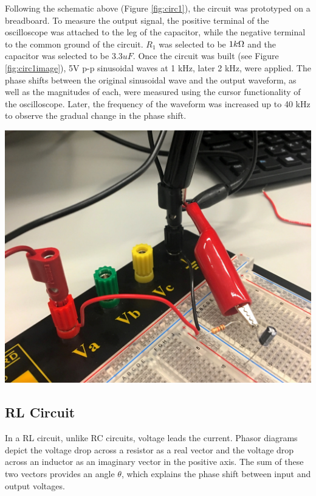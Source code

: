 \documentclass[journal]{IEEEtran}
\begin{document}
\noindent Following the schematic above (Figure \ref{fig:circ1}), the circuit was prototyped on a breadboard. To measure the output signal, the positive terminal of the oscilloscope was attached to the leg of the capacitor, while the negative terminal to the common ground of the circuit. $R_1$ was selected to be $1k\ohm$ and the capacitor was selected to be 3.3$uF$. Once the circuit was built (see Figure \ref{fig:circ1image}), 5V p-p sinusoidal waves at 1 kHz, later 2 kHz, were applied. The phase shifts between the original sinusoidal wave and the output waveform, as well  as the magnitudes of each, were measured using the cursor functionality of the oscilloscope. Later, the frequency of the waveform was increased up to 40 kHz to observe the gradual change in the phase shift.

\bigskip

\begingroup
    \centering
    \medskip
    \includegraphics[width=\columnwidth]{images/lab8_circ1.jpg}
    \label{fig:circ1image}
    \medskip
\endgroup



\subsection{RL Circuit}
\noindent In a RL circuit, unlike RC circuits, voltage leads the current. Phasor diagrams depict the voltage drop across a resistor as a real vector and the voltage drop across an inductor as an imaginary vector in the positive axis. The sum of these two vectors provides an angle $\theta$, which explains the phase shift between input and output voltages.\\
\end{document}
